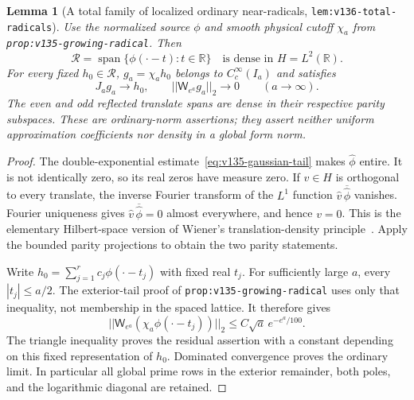 \documentclass[11pt]{article}
\def\norm#1{||#1||}%
\newtheorem{lemma}[theorem]{Lemma}
\theoremstyle{remark}
\newcommand{\norm}[1]{\left\lVert #1\right\rVert}
\begin{document}
\begin{lemma}[A total family of localized ordinary near-radicals, \texttt{lem:v136-total-radicals}]
\label{lem:v136-total-radicals}
Use the normalized source $\phi$ and smooth physical cutoff $\chi_a$ from \texttt{prop:v135-growing-radical}. Then
\[
  \mathcal{R} = \operatorname{span}\{\phi(\cdot - t) : t \in \mathbb{R}\} \quad \text{is dense in } H = L^2(\mathbb{R}).
\]
For every fixed $h_0 \in \mathcal{R}$, $g_a = \chi_a h_0$ belongs to $C_c^\infty(I_a)$ and satisfies
\begin{equation}\label{eq:v136-dense-residual}
  J_a g_a \longrightarrow h_0, \qquad \norm{\mathsf{W}_{e^a} g_a}_2 \longrightarrow 0 \qquad (a \to \infty).
\end{equation}
The even and odd reflected translate spans are dense in their respective parity subspaces. These are ordinary-norm assertions; they assert neither uniform approximation coefficients nor density in a global form norm.
\end{lemma}
\begin{proof}
The double-exponential estimate~\eqref{eq:v135-gaussian-tail} makes $\widehat{\phi}$ entire. It is not identically zero, so its real zeros have measure zero. If $v \in H$ is orthogonal to every translate, the inverse Fourier transform of the $L^1$ function $\widehat{v}\,\overline{\widehat{\phi}}$ vanishes. Fourier uniqueness gives $\widehat{v}\,\overline{\widehat{\phi}} = 0$ almost everywhere, and hence $v = 0$. This is the elementary Hilbert-space version of Wiener's translation-density principle~\cite{Wiener1932}. Apply the bounded parity projections to obtain the two parity statements.

Write $h_0 = \sum_{j=1}^r c_j \phi(\cdot - t_j)$ with fixed real $t_j$. For sufficiently large $a$, every $|t_j| \le a/2$. The exterior-tail proof of \texttt{prop:v135-growing-radical} uses only that inequality, not membership in the spaced lattice. It therefore gives
\[
  \norm{\mathsf{W}_{e^a}(\chi_a\phi(\cdot - t_j))}_2 \le C\sqrt{a}\,e^{-e^a/100}.
\]
The triangle inequality proves the residual assertion with a constant depending on this fixed representation of $h_0$. Dominated convergence proves the ordinary limit. In particular all global prime rows in the exterior remainder, both poles, and the logarithmic diagonal are retained.
\end{proof}
\end{document}
